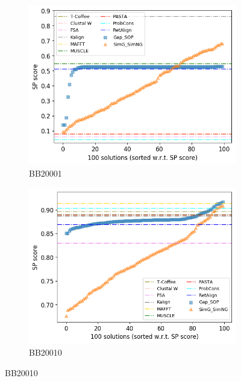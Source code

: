 \begin{figure}[!htbp]
	\centering
	\begin{adjustwidth}{-1cm}{-1cm}
		\begin{subfigure}{0.22\textwidth}
			\includegraphics[width=\columnwidth]{Figure/summary/precomputedInit/Balibase/BB20001_pairs_density_single_run_2}
			\caption{BB20001}
		\end{subfigure}	
		\begin{subfigure}{0.22\textwidth}
			\includegraphics[width=\columnwidth]{Figure/summary/precomputedInit/Balibase/BB20010_pairs_density_single_run_2}
			\caption{BB20010}
		\end{subfigure}

\end{adjustwidth}
\end{figure}
